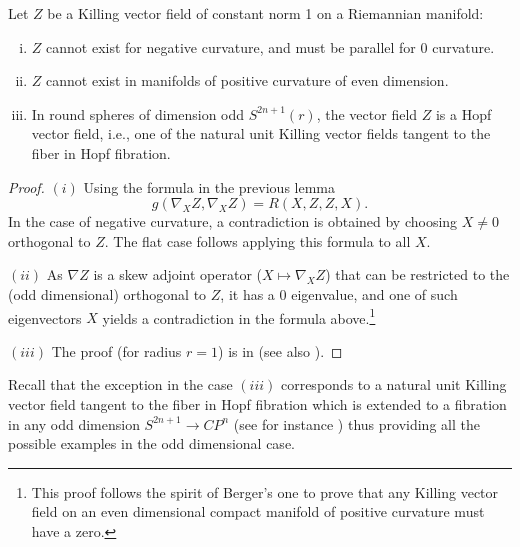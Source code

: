 \documentclass[reqno,10pt]{amsart}
\begin{document}
\begin{prop}\label{p4.2} Let $Z$ be a Killing vector field of constant norm 1 on a Riemannian manifold:
\begin{enumerate}[(i)]
 \item $Z$ cannot exist for negative curvature, and must be parallel for 0 curvature. 
 
 

\item $Z$ cannot exist in manifolds of positive curvature of even dimension.  %


\item In round spheres of dimension odd $S^{2n+1}(r)$, the vector field $Z$ is a Hopf vector field, i.e., 
one of the natural unit Killing vector fields  tangent to the fiber in 
Hopf fibration. %
\end{enumerate}

\end{prop}
 \begin{proof} $(i)$  Using  the formula in  the previous lemma 
 $$
 g(\nabla_X Z,\nabla_X Z) 
= R(X,Z,Z,X).  $$
 In the case of negative curvature, a contradiction is obtained by choosing $X\neq 0$ orthogonal to $Z$. The flat case follows applying this formula to all $X$. 

 $(ii)$
 As $ \nabla Z  $ is a skew adjoint operator  ($X\mapsto \nabla_XZ$)  that  can be restricted to the (odd dimensional) orthogonal to $Z$, it has a 0 eigenvalue,  and   one of  such  eigenvectors  $X$  yields a contradiction in the formula above.\footnote{This proof follows the spirit of Berger's one \cite{Berger} to prove that  any Killing vector field on an even dimensional compact manifold of positive curvature must have a zero.}

$(iii)$ The proof (for  radius  $r=1$)  is  in \cite[Theorem 1]{Wieg} (see also  \cite[\S 3]{GilLli}).
\end{proof}

Recall that the exception in the case $(iii)$  corresponds to  a natural unit Killing vector field  tangent to the fiber in Hopf fibration   which is extended to  a fibration in any odd dimension  $S^{2n+1}\rightarrow CP^{n}$  (see for instance \cite[Vol. II, p. 135]{KoNo2}) thus providing all the possible examples in the odd dimensional case.
\end{document}
